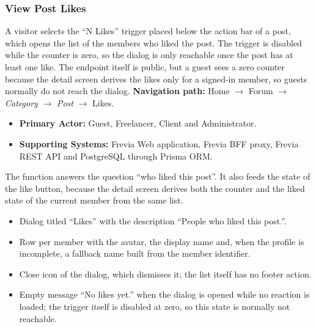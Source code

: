 
\subsubsection{ View Post Likes}

A visitor selects the ``N Likes'' trigger placed below the action bar of a post, which opens the
list of the members who liked the post. The trigger is disabled while the counter is zero, so the
dialog is only reachable once the post has at least one like. The endpoint itself is public, but a
guest sees a zero counter because the detail screen derives the likes only for a signed-in member,
so guests normally do not reach the dialog.\newline
\textbf{Navigation path:} Home $\rightarrow$ Forum $\rightarrow$ \textit{Category} $\rightarrow$
\textit{Post} $\rightarrow$ Likes.


\begin{itemize}[leftmargin=1.6em,topsep=3pt,itemsep=2pt,parsep=0pt,label=$\bullet$]
      \item \textbf{Primary Actor:} Guest, Freelancer, Client and Administrator.
      \item \textbf{Supporting Systems:} Frevia Web application, Frevia BFF proxy, Frevia REST API
            and PostgreSQL through Prisma ORM.
\end{itemize}

\noindent The function answers the question ``who liked this post''. It also feeds the state of
the like button, because the detail screen derives both the counter and the liked state of the
current member from the same list.

\begin{itemize}[leftmargin=1.6em,topsep=3pt,itemsep=2pt,parsep=0pt,label=$\bullet$]
      \item Dialog titled ``Likes'' with the description ``People who liked this post.''.
      \item Row per member with the avatar, the display name and, when the profile is
            incomplete, a fallback name built from the member identifier.
      \item Close icon of the dialog, which dismisses it; the list itself has no footer
            action.
      \item Empty message ``No likes yet.'' when the dialog is opened while no reaction is
            loaded; the trigger itself is disabled at zero, so this state is normally not
            reachable.
\end{itemize}

